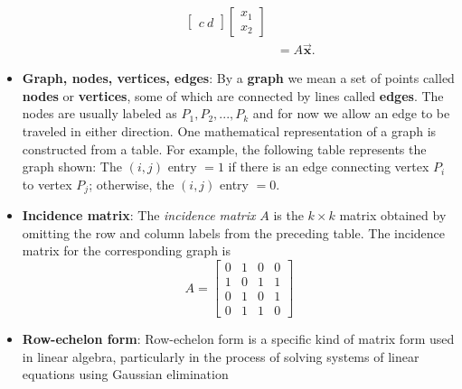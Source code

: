\documentclass{report}
\begin{document}
\begin{itemize}
\begin{itemize}
\begin{align*}
\begin{bmatrix}
                                                                        c\ d
                                                                    \end{bmatrix} \begin{bmatrix}
                                                                        x_{1} \\ x_{2}
                                                                    \end{bmatrix} \\
                                                                    &= A\vec{\mathbf{x}}
                          .\end{align*}
                  \end{itemize}
              \item \textbf{Graph, nodes, vertices, edges}:
                  By a \textbf{graph} we mean a set of points called \textbf{nodes} or \textbf{vertices}, some of which are
                  connected by lines called \textbf{edges}. The nodes are usually labeled as $P_{1}, P_{2}, ..., P_{k} $ and for now we allow an edge to be traveled in either direction. One mathematical
                  representation of a graph is constructed from a table. For example, the following
                  table represents the graph shown:
                  \bigbreak \noindent 
                  \bigbreak \noindent 
                  The \( (i, j) \) entry \( = 1 \) if there is an edge connecting vertex \( P_i \) to vertex \( P_j \); otherwise, the \( (i, j) \) entry \( = 0 \). 
              \item \textbf{Incidence matrix}: The \textit{incidence matrix} \( A \) is the \( k \times k \) matrix obtained by omitting the row and column labels from the preceding table. The incidence matrix for the corresponding graph is
                  \[
                      A = \begin{bmatrix}
                          0 & 1 & 0 & 0 \\
                          1 & 0 & 1 & 1 \\
                          0 & 1 & 0 & 1 \\
                          0 & 1 & 1 & 0
                      \end{bmatrix}
                  \]
            \item \textbf{Row-echelon form}: Row-echelon form is a specific kind of matrix form used in linear algebra, particularly in the process of solving systems of linear equations using Gaussian elimination

\end{itemize}
\end{document}
